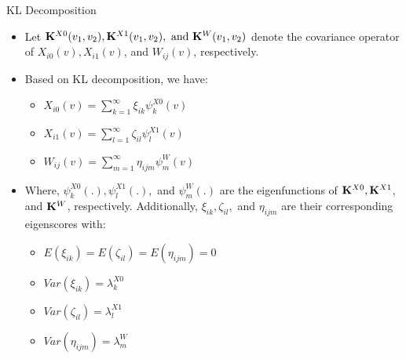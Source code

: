 \documentclass[
  ignorenonframetext,
]{beamer}
\providecommand{\tightlist}{%
  \setlength{\itemsep}{0pt}\setlength{\parskip}{0pt}}
\begin{document}
\begin{frame}{KL Decomposition}
\protect\hypertarget{kl-decomposition}{}
\begin{itemize}
\item
  Let
  \(\mathrm{\bf{K}}^{X0}(v_1, v_2), \mathrm{\bf{K}}^{X1}(v_1, v_2), \text{ and } \mathrm{\bf{K}}^{W}(v_1, v_2)\)
  denote the covariance operator of \(X_{i0}(v), X_{i1}(v)\), and
  \(W_{ij}(v)\), respectively.
\item
  Based on KL decomposition, we have:

  \begin{itemize}
  \tightlist
  \item
    \(X_{i0}(v) = \sum^{\infty}_{k=1} \xi_{ik} \psi_{k}^{X0}(v)\)
  \item
    \(X_{i1}(v) = \sum^{\infty}_{l=1} \zeta_{il} \psi_{l}^{X1}(v)\)
  \item
    \(W_{ij}(v) = \sum^{\infty}_{m=1} \eta_{ijm} \psi_{m}^{W}(v)\)
  \end{itemize}
\item
  Where, \(\psi_{k}^{X0}(.), \psi_{l}^{X1}(.),\) and \(\psi_{m}^{W}(.)\)
  are the eigenfunctions of
  \(\mathrm{\bf{K}}^{X0}, \mathrm{\bf{K}}^{X1}\), and
  \(\mathrm{\bf{K}}^{W}\), respectively. Additionally,
  \(\xi_{ik}, \zeta_{il},\) and \(\eta_{ijm}\) are their corresponding
  eigenscores with:

  \begin{itemize}
  \tightlist
  \item
    \(E(\xi_{ik}) = E(\zeta_{il}) = E(\eta_{ijm}) = 0\)
  \item
    \(Var(\xi_{ik}) = \lambda_k^{X0}\)
  \item
    \(Var(\zeta_{il}) = \lambda_l^{X1}\)
  \item
    \(Var(\eta_{ijm}) = \lambda_m^{W}\)
  \end{itemize}
\end{itemize}
\end{frame}
\end{document}
